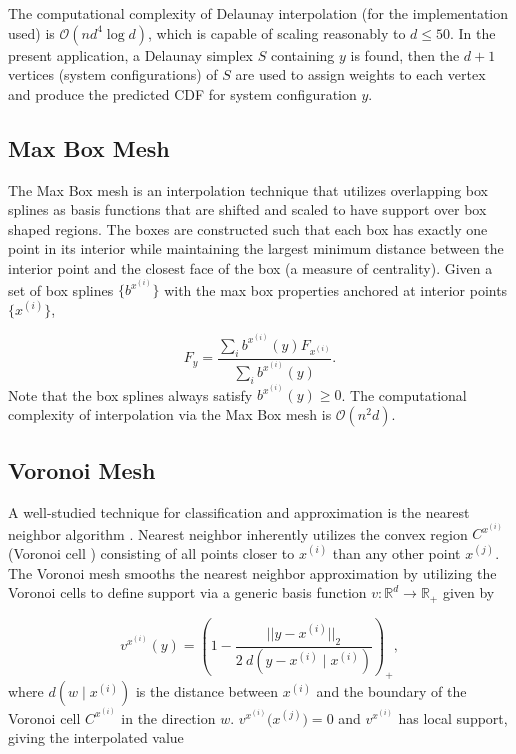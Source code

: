 \documentclass[letterpaper, 10 pt, conference]{ieeeconf}  %
\begin{document}
The computational complexity of Delaunay interpolation (for the implementation used) is $\mathcal{O}(n d^4 \log d)$, which is capable of scaling reasonably to $d \leq 50$. In the present application, a Delaunay simplex $S$ containing $y$ is found, then the $d+1$ vertices (system configurations) of $S$ are used to assign weights to each vertex and produce the predicted CDF for system configuration $y$.

\subsection{Max Box Mesh}
\label{sec:max_box_mesh}

The Max Box mesh is an interpolation technique that utilizes overlapping box splines \cite{de2013box} as basis functions that are shifted and scaled to have support over box shaped regions. The boxes are constructed such that each box has exactly one point in its interior while maintaining the largest minimum distance between the interior point and the closest face of the box (a measure of centrality). Given a set of box splines $\bigl\{b^{x^{(i)}}\bigr\}$ with the max box properties anchored at interior points $\bigl\{x^{(i)}\bigr\}$,

$$ F_y = \frac{\sum_i b^{x^{(i)}}(y) F_{x^{(i)}}}{\sum_i b^{x^{(i)}}(y)}. $$
Note that the box splines always satisfy $b^{x^{(i)}}(y) \geq 0$. The computational complexity of interpolation via the Max Box mesh is $\mathcal{O}(n^2 d)$.

\subsection{Voronoi Mesh}
\label{sec:voronoi_mesh}

A well-studied technique for classification and approximation is the nearest neighbor algorithm \cite{cover1967nearest}. Nearest neighbor inherently utilizes the convex region $C^{x^{(i)}}$ (Voronoi cell \cite{dirichlet1850reduction}) consisting of all points closer to $x^{(i)}$ than any other point $x^{(j)}$. The Voronoi mesh smooths the nearest neighbor approximation by utilizing the Voronoi cells to define support via a generic basis function $v: \mathbb{R}^d \rightarrow \mathbb{R}_+$ given by

$$ v^{x^{(i)}}(y) = \left(1 - \frac{||y - x^{(i)}||_2}{2 \ d(y - x^{(i)} \mid x^{(i)})} \right)_+, $$
where $d(w \mid x^{(i)})$ is the distance between $x^{(i)}$ and the boundary of the Voronoi cell $C^{x^{(i)}}$ in the direction $w$. $v^{x^{(i)}}\bigl(x^{(j)}\bigr) = 0$ and $v^{x^{(i)}}$ has local support, giving the interpolated value
\end{document}

